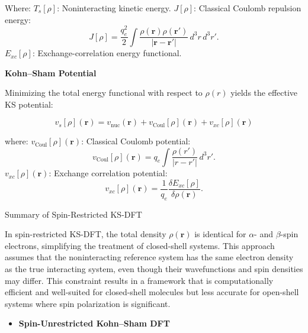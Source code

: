 \documentclass[%
 preprint, linenumbers,
 amsmath,amssymb,
 aps, physrev,
]{revtex4-2}
\begin{document}
Where:
\( T_s[\rho] \): Noninteracting kinetic energy.
 \( J[\rho] \): Classical Coulomb repulsion energy:
  \begin{equation}
        J[\rho] = \frac{q_e^2}{2} \int \frac{\rho(\mathbf{r}) \rho(\mathbf{r'})}{\mathbf{|r - r'}|} \, d^3r \, d^3r'.
  \end{equation}
\( E_{xc}[\rho] \): Exchange-correlation energy functional.

\textbf{Kohn–Sham Potential}

Minimizing the total energy functional with respect to \( \rho(r) \) yields the effective KS potential:

\begin{equation}
    v_s[\rho](\mathbf{r}) = v_{\text{nuc}}(\mathbf{r}) + v_{\text{Coul}}[\rho](\mathbf{r}) + v_{xc}[\rho](\mathbf{r})
\end{equation}

where:
 \( v_{\text{Coul}}[\rho](\mathbf{r}) \): Classical Coulomb potential:
  \[
  v_{\text{Coul}}[\rho](\mathbf{r}) = q_e \int \frac{\rho(r')}{|r - r'|} \, d^3r'.
  \]
 \( v_{xc}[\rho](\mathbf{r}) \): Exchange correlation potential:
  \begin{equation}
      v_{xc}[\rho](\mathbf{r}) = \frac{1}{q_e} \frac{\delta E_{xc}[\rho]}{\delta \rho(\mathbf{r})}.
  \end{equation}

 Summary of Spin-Restricted KS-DFT

In spin-restricted KS-DFT, the total density \( \rho(\mathbf{r}) \) is identical for \( \alpha \)- and \( \beta \)-spin electrons, simplifying the treatment of closed-shell systems. This approach assumes that the noninteracting reference system has the same electron density as the true interacting system, even though their wavefunctions and spin densities may differ. This constraint results in a framework that is computationally efficient and well-suited for closed-shell molecules but less accurate for open-shell systems where spin polarization is significant.


\begin{itemize}
    \item  \textbf{Spin-Unrestricted Kohn–Sham DFT}
\end{itemize}
\end{document}
